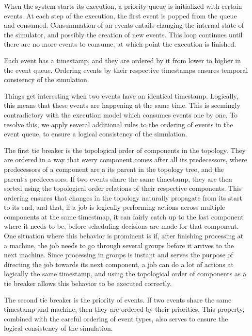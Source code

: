 When the system starts its execution, a priority queue is initialized with certain events. At each step of the execution, the first event is popped from the queue and consumed. Consummation of an events entails changing the internal state of the simulator, and possibly the creation of new events. This loop continues until there are no more events to consume, at which point the execution is finished. 

Each event has a timestamp, and they are ordered by it from lower to higher in the event queue. Ordering events by their respective timestamps ensures temporal consisency of the simulation.

Things get interesting when two events have an identical timestamp. Logically, this means that these events are happening at the same time. This is seemingly contradictory with the execution model which consumes events one by one. To resolve this, we apply several additional rules to the ordering of events in the event queue, to ensure a logical consistency of the simulation.

The first tie breaker is the topological order of components in the topology. They are ordered in a way that every component comes after all its predecessors, where predecessors of a component are a its parent in the topology tree, and the parent's predecessors. If two events share the same timestamp, they are then sorted using the topological order relations of their respective components. This ordering ensures that changes in the topology naturally propagate from its start to its end, and that, if a job is logically performing actions across multiple components at the same timestmap, it can fairly catch up to the last component where it needs to be, before scheduling decisions are made for that component. One situation where this behavior is prominent is if, after finishing processing at a machine, the job needs to go through several groups before it arrives to the next machine. Since processing in groups is instant and serves the purpose of directing the job towards its next component, a job can do a lot of actions at logically the same timestamp, and using the topological order of components as a tie breaker allows this behavior to be executed correctly.

The second tie breaker is the priority of events. If two events share the same timestamp and machine, then they are ordered by their priorities. This property, combined with the careful ordering of event types, also serves to ensure the logical consistency of the simulation.

